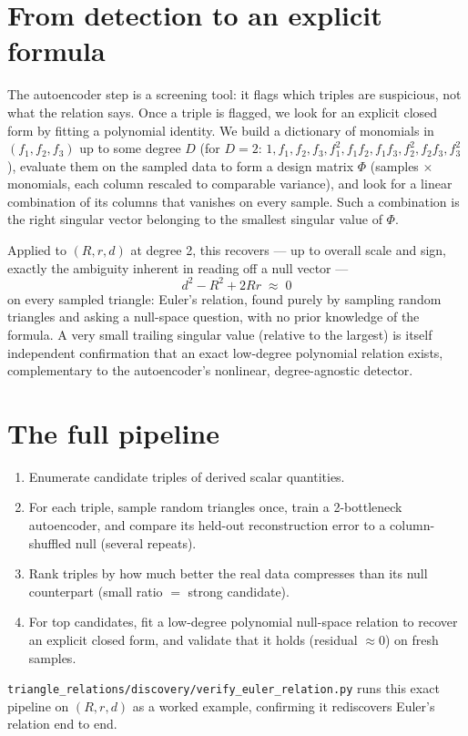 \documentclass[11pt]{article}
\begin{document}
\section{From detection to an explicit formula}

The autoencoder step is a screening tool: it flags which triples are
suspicious, not what the relation says. Once a triple is flagged, we look for
an explicit closed form by fitting a polynomial identity. We build a
dictionary of monomials in $(f_1,f_2,f_3)$ up to some degree $D$ (for $D=2$:
$1, f_1, f_2, f_3, f_1^2, f_1 f_2, f_1 f_3, f_2^2, f_2 f_3, f_3^2$), evaluate
them on the sampled data to form a design matrix $\Phi$ (samples $\times$
monomials, each column rescaled to comparable variance), and look for a
linear combination of its columns that vanishes on every sample. Such a
combination is the right singular vector belonging to the smallest singular
value of $\Phi$.

Applied to $(R, r, d)$ at degree 2, this recovers — up to overall scale and
sign, exactly the ambiguity inherent in reading off a null vector —
\[
  d^2 - R^2 + 2Rr \;\approx\; 0
\]
on every sampled triangle: Euler's relation, found purely by sampling random
triangles and asking a null-space question, with no prior knowledge of the
formula. A very small trailing singular value (relative to the largest) is
itself independent confirmation that an exact low-degree polynomial relation
exists, complementary to the autoencoder's nonlinear, degree-agnostic
detector.

\section{The full pipeline}

\begin{enumerate}
  \item Enumerate candidate triples of derived scalar quantities.
  \item For each triple, sample random triangles once, train a 2-bottleneck
    autoencoder, and compare its held-out reconstruction error to a
    column-shuffled null (several repeats).
  \item Rank triples by how much better the real data compresses than its
    null counterpart (small ratio $=$ strong candidate).
  \item For top candidates, fit a low-degree polynomial null-space relation
    to recover an explicit closed form, and validate that it holds (residual
    $\approx 0$) on fresh samples.
\end{enumerate}

\texttt{triangle\_relations/discovery/verify\_euler\_relation.py} runs this
exact pipeline on $(R, r, d)$ as a worked example, confirming it rediscovers
Euler's relation end to end.
\end{document}
